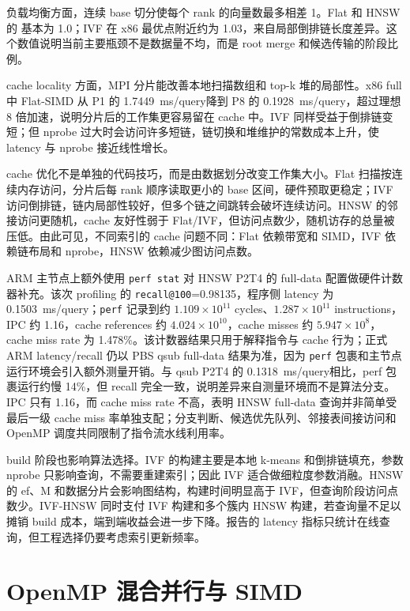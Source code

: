 \documentclass[11pt,a4paper]{article}
\newcommand{\msq}{ms/query}
\begin{document}
负载均衡方面，连续 base 切分使每个 rank 的向量数最多相差 1。Flat 和 HNSW 的  基本为 1.0；IVF 在 x86 最优点附近约为 1.03，来自局部倒排链长度差异。这个数值说明当前主要瓶颈不是数据量不均，而是 root merge 和候选传输的阶段比例。

cache locality 方面，MPI 分片能改善本地扫描数组和 top-k 堆的局部性。x86 full 中 Flat-SIMD 从 P1 的 1.7449~\msq 降到 P8 的 0.1928~\msq，超过理想 8 倍加速，说明分片后的工作集更容易留在 cache 中。IVF 同样受益于倒排链变短；但 nprobe 过大时会访问许多短链，链切换和堆维护的常数成本上升，使 latency 与 nprobe 接近线性增长。

cache 优化不是单独的代码技巧，而是由数据划分改变工作集大小。Flat 扫描按连续内存访问，分片后每 rank 顺序读取更小的 base 区间，硬件预取更稳定；IVF 访问倒排链，链内局部性较好，但多个链之间跳转会破坏连续访问。HNSW 的邻接访问更随机，cache 友好性弱于 Flat/IVF，但访问点数少，随机访存的总量被压低。由此可见，不同索引的 cache 问题不同：Flat 依赖带宽和 SIMD，IVF 依赖链布局和 nprobe，HNSW 依赖减少图访问点数。

ARM 主节点上额外使用 \texttt{perf stat} 对 HNSW P2T4 的 full-data 配置做硬件计数器补充。该次 profiling 的 \texttt{recall@100}=0.98135，程序侧 latency 为 0.1503~\msq；\texttt{perf} 记录到约 $1.109\times10^{11}$ cycles、$1.287\times10^{11}$ instructions，IPC 约 1.16，cache references 约 $4.024\times10^{10}$，cache misses 约 $5.947\times10^8$，cache miss rate 为 1.478\%。该计数器结果只用于解释指令与 cache 行为；正式 ARM latency/recall 仍以 PBS qsub full-data 结果为准，因为 \texttt{perf} 包裹和主节点运行环境会引入额外测量开销。与 qsub P2T4 的 0.1318~\msq 相比，perf 包裹运行约慢 14\%，但 recall 完全一致，说明差异来自测量环境而不是算法分支。IPC 只有 1.16，而 cache miss rate 不高，表明 HNSW full-data 查询并非简单受最后一级 cache miss 率单独支配；分支判断、候选优先队列、邻接表间接访问和 OpenMP 调度共同限制了指令流水线利用率。

build 阶段也影响算法选择。IVF 的构建主要是本地 k-means 和倒排链填充，参数 nprobe 只影响查询，不需要重建索引；因此 IVF 适合做细粒度参数消融。HNSW 的 ef、M 和数据分片会影响图结构，构建时间明显高于 IVF，但查询阶段访问点数少。IVF-HNSW 同时支付 IVF 构建和多个簇内 HNSW 构建，若查询量不足以摊销 build 成本，端到端收益会进一步下降。报告的 latency 指标只统计在线查询，但工程选择仍要考虑索引更新频率。

\section{OpenMP 混合并行与 SIMD}
\end{document}
